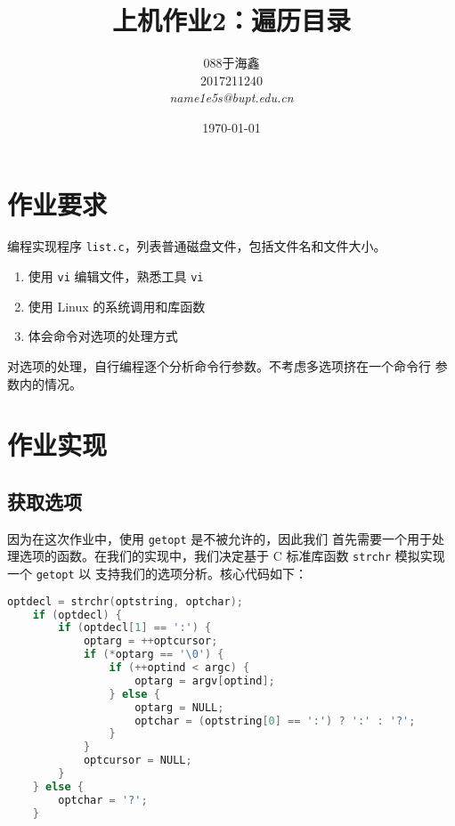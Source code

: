 \documentclass[blue,normal,cn]{elegantnote}
\title{上机作业2：遍历目录}
\date{\today}
\newcommand{\code}[1]{\colorbox{light-gray}{\texttt{#1}}}
\begin{document}
\author{
	\begin{tabular}[t]{c}
		088于海鑫  \\
		2017211240 \\
		\emph{name1e5s@bupt.edu.cn}
	\end{tabular}
}
\maketitle

\section{作业要求}

编程实现程序 \code{list.c}，列表普通磁盘文件，包括文件名和文件大小。

\begin{enumerate}
	\item 使用 \code{vi} 编辑文件，熟悉工具 \code{vi}
	\item 使用 Linux 的系统调用和库函数
	\item 体会命令对选项的处理方式
\end{enumerate}

对选项的处理，自行编程逐个分析命令行参数。不考虑多选项挤在一个命令行
参数内的情况。

\section{作业实现}

\subsection{获取选项}

因为在这次作业中，使用 \code{getopt} 是不被允许的，因此我们
首先需要一个用于处理选项的函数。在我们的实现中，我们决定基于
C 标准库函数 \code{strchr} 模拟实现一个 \code{getopt} 以
支持我们的选项分析。核心代码如下：

\begin{lstlisting}[language=C]
    optdecl = strchr(optstring, optchar);
    if (optdecl) {
        if (optdecl[1] == ':') {
            optarg = ++optcursor;
            if (*optarg == '\0') {
                if (++optind < argc) {
                    optarg = argv[optind];
                } else {
                    optarg = NULL;
                    optchar = (optstring[0] == ':') ? ':' : '?';
                }
            }
            optcursor = NULL;
        }
    } else {
        optchar = '?';
    }
\end{lstlisting}
\end{document}
